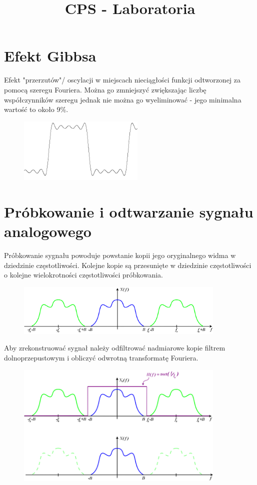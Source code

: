 \documentclass[11pt]{article}
\title{CPS - Laboratoria}
\begin{document}
\maketitle

\section{Efekt Gibbsa}
Efekt "przerzutów"/ oscylacji w miejscach nieciągłości funkcji odtworzonej za pomocą szeregu Fouriera. Można go zmniejszyć zwiększając liczbę współczynników szeregu jednak nie można go wyeliminować - jego minimalna wartość to około 9\%. 

\begin{figure}[h]
    \centering
    \includegraphics[width=6cm]{gibbs.png}
\end{figure}

\section{Próbkowanie i odtwarzanie sygnału analogowego}
Próbkowanie sygnału powoduje powstanie kopii jego oryginalnego widma w dziedzinie częstotliwości. Kolejne kopie są przesunięte w dziedzinie częstotliwości o kolejne wielokrotności częstotliwości próbkowania.
\begin{figure}[h]
    \centering
    \includegraphics[width=10cm]{sampling.png}
\end{figure}


Aby zrekonstruować sygnał należy odfiltrować nadmiarowe kopie filtrem dolnoprzepustowym i obliczyć odwrotną transformatę Fouriera.
\begin{figure}[h]
    \centering
    \includegraphics[width=10cm]{sampling2.png}
\end{figure}
\end{document}
